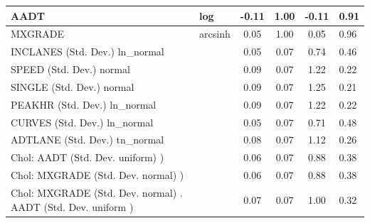 \begin{table}
\begin{center}
\begin{tabular}{|l|l|c|c|c|l|}
			AADT & log & -0.11 & 1.00 & -0.11 & 0.91 \\
			\hline
			MXGRADE & arcsinh & 0.05 & 1.00 & 0.05 & 0.96 \\
			\hline
			INCLANES (Std. Dev.) ln_normal &  & 0.05 & 0.07 & 0.74 & 0.46 \\
			\hline
			SPEED (Std. Dev.) normal &  & 0.09 & 0.07 & 1.22 & 0.22 \\
			\hline
			SINGLE (Std. Dev.) normal &  & 0.09 & 0.07 & 1.25 & 0.21 \\
			\hline
			PEAKHR (Std. Dev.) ln_normal &  & 0.09 & 0.07 & 1.22 & 0.22 \\
			\hline
			CURVES (Std. Dev.) ln_normal &  & 0.05 & 0.07 & 0.71 & 0.48 \\
			\hline
			ADTLANE (Std. Dev.) tn_normal &  & 0.08 & 0.07 & 1.12 & 0.26 \\
			\hline
			 Chol: AADT (Std. Dev. uniform) ) &  & 0.06 & 0.07 & 0.88 & 0.38 \\
			\hline
			 Chol: MXGRADE (Std. Dev. normal) ) &  & 0.06 & 0.07 & 0.88 & 0.38 \\
			\hline
			 Chol: MXGRADE (Std. Dev. normal) . AADT (Std. Dev.   uniform ) &  & 0.07 & 0.07 & 1.00 & 0.32 \\
			\hline
		\end{tabular}
	\end{center}
\end{table}